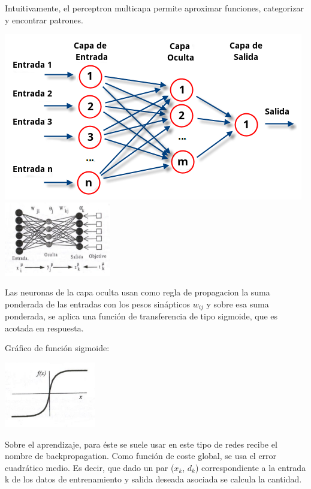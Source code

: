 Intuitivamente, el perceptron multicapa permite aproximar funciones, categorizar y encontrar patrones.

\begin{center}
\includegraphics{img/pmulticapa}
\includegraphics[width=0.35\textwidth]{img/pmulticapa2}
\end{center}

Las neuronas de la capa oculta usan como regla de propagacion la suma ponderada de las entradas con los pesos sinápticos $w_{ij}$ y sobre esa suma ponderada, se aplica una función de transferencia de tipo sigmoide, que es acotada en respuesta.

\newpage
Gráfico de función sigmoide:

\begin{center}
\includegraphics[width=0.30\textwidth]{img/sigmoide}
\end{center}

Sobre el aprendizaje, para éste se suele usar en este tipo de redes recibe el nombre de backpropagation. Como función de coste global, se usa el error cuadrático medio. Es decir, que dado un par ($x_k$, $d_k$) correspondiente a la entrada k de los datos de entrenamiento y salida deseada asociada se calcula la cantidad.

